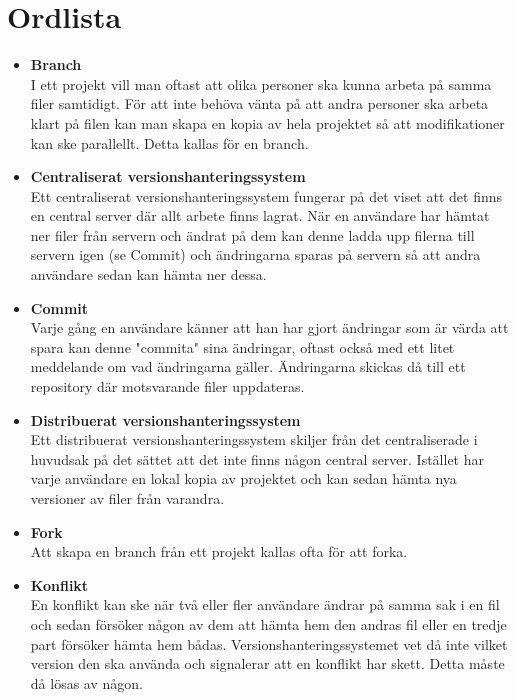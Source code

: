 \section{Ordlista}
\begin{itemize}
	\item \textbf{Branch}
	\\I ett projekt vill man oftast att olika personer ska kunna arbeta på samma filer samtidigt. För att inte behöva vänta på att andra personer ska arbeta klart på filen kan man skapa en kopia av hela projektet så att modifikationer kan ske parallellt. Detta kallas för en branch.
	
	\item \textbf{Centraliserat versionshanteringssystem}
	\\Ett centraliserat versionshanteringssystem fungerar på det viset att det finns en central server där allt arbete finns lagrat. När en användare har hämtat ner filer från servern och ändrat på dem kan denne ladda upp filerna till servern igen (se Commit) och ändringarna sparas på servern så att andra användare sedan kan hämta ner dessa.
	
	\item \textbf{Commit}
	\\Varje gång en användare känner att han har gjort ändringar som är värda att spara kan denne "commita" sina ändringar, oftast också med ett litet meddelande om vad ändringarna gäller. Ändringarna skickas då till ett repository där motsvarande filer uppdateras.
	
	\item \textbf{Distribuerat versionshanteringssystem}
	\\Ett distribuerat versionshanteringssystem skiljer från det centraliserade i huvudsak på det sättet att det inte finns någon central server. Istället har varje användare en lokal kopia av projektet och kan sedan hämta nya versioner av filer från varandra.
	
	\item \textbf{Fork}
	\\Att skapa en branch från ett projekt kallas ofta för att forka.
	
	\item \textbf{Konflikt}
	\\En konflikt kan ske när två eller fler användare ändrar på samma sak i en fil och sedan försöker någon av dem att hämta hem den andras fil eller en tredje part försöker hämta hem bådas. Versionshanteringssystemet vet då inte vilket version den ska använda och signalerar att en konflikt har skett. Detta måste då lösas av någon.


\end{itemize}
